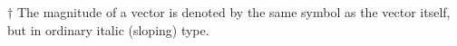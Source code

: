 \begin{table}[h]
\begin{center}
{\begin{threeparttable}[b]
\begin{tabular}{p{0.5cm} p{11cm}}
			\end{tabular}
            \begin{tablenotes}
    			\item [${\dagger}$] The magnitude of a vector is denoted by the same symbol as the vector itself, but in ordinary italic (sloping) type.
    		\end{tablenotes}
        \end{threeparttable}
	}\end{center}
\end{table}

